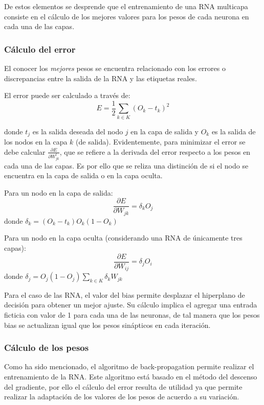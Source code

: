 \documentclass[journal]{IEEEtran}
\begin{document}
De estos elementos se desprende que el entrenamiento de una RNA multicapa consiste en el cálculo de los mejores valores para los pesos de cada neurona en cada una de las capas.

\subsubsection{Cálculo del error} %
\label{ssub:c_lculo_del_error}

El conocer los \emph{mejores} pesos se encuentra relacionado con los errores o discrepancias entre la salida de la RNA y las etiquetas reales.

El error puede ser calculado a través de:
$$
E=\frac{1}{2} \sum_{k\in K}(O_k - t_k)^2
$$

donde $t_j$ es la salida deseada del nodo $j$ en la capa de salida y $O_k$ es la salida de los nodos en la capa $k$ (de salida).
Evidentemente, para minimizar el error se debe calcular $\frac{\partial E}{\partial W_{jk}^l}$, que se refiere a la derivada del error respecto a los pesos en cada una de las capas.
Es por ello que se reliza una distinción de si el nodo se encuentra en la capa de salida o en la capa oculta.

Para un nodo en la capa de salida:
$$
\frac{\partial E}{\partial W_{jk}} = \delta_k O_j
$$
donde $\delta _k = (O_k - t_k) O_k (1 - O_k)$


Para un nodo en la capa oculta (considerando una RNA de únicamente tres capas):
$$
\frac{\partial E}{\partial W_{ij}} = \delta_j O_i
$$
donde $\delta _j = O_j (1 - O_j) \sum_{k \in K}\delta _k W_{jk}$

Para el caso de las RNA, el valor del bias permite desplazar el hiperplano de decisión para obtener un mejor ajuste.
Su cálculo implica el agregar una entrada ficticia con valor de 1 para cada una de las neuronas, de tal manera que los pesos bias se actualizan igual que los pesos sinápticos en cada iteración.

\subsubsection{Cálculo de los pesos} %
\label{ssub:c_lculo_de_los_pesos}
Como ha sido mencionado, el algoritmo de back-propagation permite realizar el entrenamiento de la RNA.
Este algoritmo está basado en el método del descenso del gradiente, por ello el cálculo del error resulta de utilidad ya que permite realizar la adaptación de los valores de los pesos de acuerdo a su variación.
\end{document}
